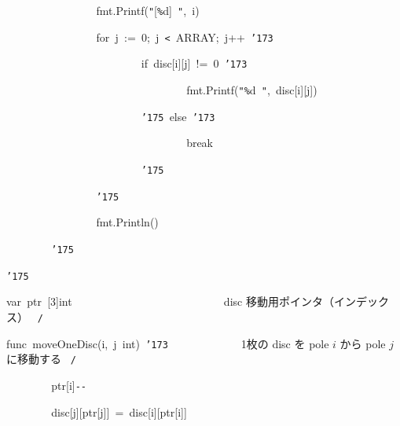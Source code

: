 \documentclass{article}
\begin{document}
\noindent
\mbox{}{\tt\mc \ \ \ \ \ \ \ \ }{\tt\mc \ \ \ \ \ \ \ \ }fmt.Printf({\tt "}[{\tt\%}d]{\tt\mc \ }{\tt "},{\tt\mc \ }i)

\noindent
\mbox{}{\tt\mc \ \ \ \ \ \ \ \ }{\tt\mc \ \ \ \ \ \ \ \ }for{\tt\mc \ }j{\tt\mc \ }:={\tt\mc \ }0;{\tt\mc \ }j{\tt\mc \ }{\tt <}{\tt\mc \ }ARRAY;{\tt\mc \ }j++{\tt\mc \ }{\tt\char'173}

\noindent
\mbox{}{\tt\mc \ \ \ \ \ \ \ \ }{\tt\mc \ \ \ \ \ \ \ \ }{\tt\mc \ \ \ \ \ \ \ \ }if{\tt\mc \ }disc[i][j]{\tt\mc \ }!={\tt\mc \ }0{\tt\mc \ }{\tt\char'173}

\noindent
\mbox{}{\tt\mc \ \ \ \ \ \ \ \ }{\tt\mc \ \ \ \ \ \ \ \ }{\tt\mc \ \ \ \ \ \ \ \ }{\tt\mc \ \ \ \ \ \ \ \ }fmt.Printf({\tt "}{\tt\%}d{\tt\mc \ }{\tt "},{\tt\mc \ }disc[i][j])

\noindent
\mbox{}{\tt\mc \ \ \ \ \ \ \ \ }{\tt\mc \ \ \ \ \ \ \ \ }{\tt\mc \ \ \ \ \ \ \ \ }{\tt\char'175}{\tt\mc \ }else{\tt\mc \ }{\tt\char'173}

\noindent
\mbox{}{\tt\mc \ \ \ \ \ \ \ \ }{\tt\mc \ \ \ \ \ \ \ \ }{\tt\mc \ \ \ \ \ \ \ \ }{\tt\mc \ \ \ \ \ \ \ \ }break

\noindent
\mbox{}{\tt\mc \ \ \ \ \ \ \ \ }{\tt\mc \ \ \ \ \ \ \ \ }{\tt\mc \ \ \ \ \ \ \ \ }{\tt\char'175}

\noindent
\mbox{}{\tt\mc \ \ \ \ \ \ \ \ }{\tt\mc \ \ \ \ \ \ \ \ }{\tt\char'175}

\noindent
\mbox{}{\tt\mc \ \ \ \ \ \ \ \ }{\tt\mc \ \ \ \ \ \ \ \ }fmt.Println()

\noindent
\mbox{}{\tt\mc \ \ \ \ \ \ \ \ }{\tt\char'175}

\noindent
\mbox{}{\tt\char'175}

\noindent
\mbox{}\hfill

\noindent
\mbox{}var{\tt\mc \ }ptr{\tt\mc \ }[3]int{\tt\mc \ \ }{\tt\mc \ \ \ \ \ \ \ \ }{\tt\mc \ \ \ \ \ \ \ \ }{\tt\mc \ \ \ \ \ \ \ \ }\rm\mc {\tt /}{\tt *}\  {}disc 移動用ポインタ（インデックス）
					   \hfill \rm\mc \ {\tt *}{\tt /}
\tt\mc 

\noindent
\mbox{}\hfill

\noindent
\mbox{}func{\tt\mc \ }moveOneDisc(i,{\tt\mc \ }j{\tt\mc \ }int){\tt\mc \ }{\tt\char'173}{\tt\mc \ \ \ \ }{\tt\mc \ \ \ \ \ \ \ \ }\rm\mc {\tt /}{\tt *}\  {}1枚の disc を pole $i$ から
					   pole $j$ に移動する \hfill \rm\mc \ {\tt *}{\tt /}
\tt\mc 

\noindent
\mbox{}{\tt\mc \ \ \ \ \ \ \ \ }ptr[i]{\tt -}{\tt -}

\noindent
\mbox{}{\tt\mc \ \ \ \ \ \ \ \ }disc[j][ptr[j]]{\tt\mc \ }={\tt\mc \ }disc[i][ptr[i]]
\end{document}

